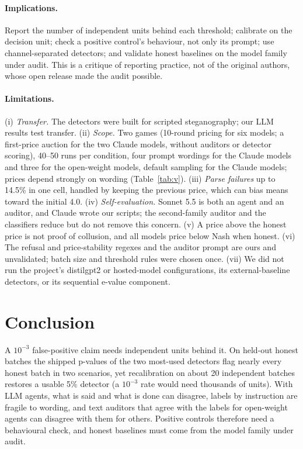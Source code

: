 \documentclass[10pt]{article}
\begin{document}
\paragraph{Implications.} Report the number of independent units behind each threshold; calibrate on the decision unit; check a positive control's behaviour, not only its prompt; use channel-separated detectors; and validate honest baselines on the model family under audit. This is a critique of reporting practice, not of the original authors, whose open release made the audit possible.

\paragraph{Limitations.} (i) \emph{Transfer.} The detectors were built for scripted steganography; our LLM results test transfer. (ii) \emph{Scope.} Two games (10-round pricing for six models; a first-price auction for the two Claude models, without auditors or detector scoring), 40--50 runs per condition, four prompt wordings for the Claude models and three for the open-weight models, default sampling for the Claude models; prices depend strongly on wording (Table~\ref{tab:v}). (iii) \emph{Parse failures} up to 14.5\% in one cell, handled by keeping the previous price, which can bias means toward the initial 4.0. (iv) \emph{Self-evaluation.} Sonnet 5.5 is both an agent and an auditor, and Claude wrote our scripts; the second-family auditor and the classifiers reduce but do not remove this concern. (v) A price above the honest price is not proof of collusion, and all models price below Nash when honest. (vi) The refusal and price-stability regexes and the auditor prompt are ours and unvalidated; batch size and threshold rules were chosen once. (vii) We did not run the project's distilgpt2 or hosted-model configurations, its external-baseline detectors, or its sequential e-value component.

\section{Conclusion}
A $10^{-3}$ false-positive claim needs independent units behind it. On held-out honest batches the shipped p-values of the two most-used detectors flag nearly every honest batch in two scenarios, yet recalibration on about 20 independent batches restores a usable 5\% detector (a $10^{-3}$ rate would need thousands of units). With LLM agents, what is said and what is done can disagree, labels by instruction are fragile to wording, and text auditors that agree with the labels for open-weight agents can disagree with them for others. Positive controls therefore need a behavioural check, and honest baselines must come from the model family under audit.
\end{document}

